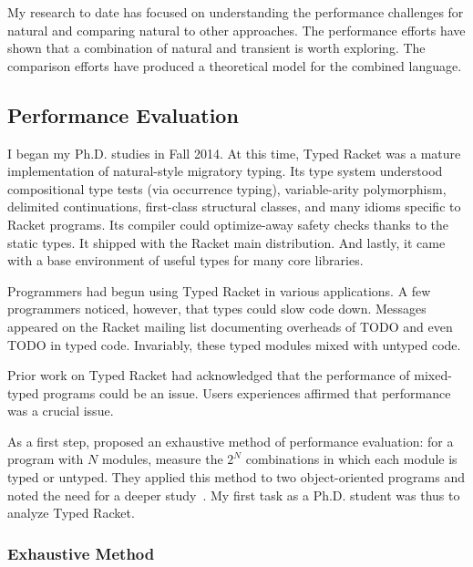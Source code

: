 %
%
%
%

My research to date has focused on
 understanding the performance challenges for natural
 and comparing natural to other approaches.
The performance efforts have shown that a combination of natural
 and transient is worth exploring.
The comparison efforts have produced a theoretical model for the combined
 language.


\subsection{Performance Evaluation}

I began my Ph.D. studies in Fall 2014.
At this time, Typed Racket was a mature implementation of natural-style
 migratory typing.
Its type system understood compositional type tests (via occurrence typing),
 variable-arity polymorphism,
 delimited continuations,
 first-class structural classes,
 and many idioms specific to Racket programs.
Its compiler could optimize-away safety checks thanks to the static types.
It shipped with the Racket main distribution.
And lastly, it came with a base environment of useful types for many core
 libraries.

Programmers had begun using Typed Racket in various applications.
A few programmers noticed, however, that types could slow code down.
Messages appeared on the Racket mailing list documenting overheads
 of TODO and even TODO in typed code.
Invariably, these typed modules mixed with untyped code.

Prior work on Typed Racket had acknowledged that the performance of mixed-typed
 programs could be an issue.
Users experiences affirmed that performance was a crucial issue.

As a first step,  proposed an exhaustive method of performance
 evaluation: for a program with $N$ modules, measure the $2^N$ combinations in
 which each module is typed or untyped.
They applied this method to two object-oriented programs and noted the need
 for a deeper study~\cite{stop}.
My first task as a Ph.D. student was thus to analyze Typed Racket.


\subsubsection{Exhaustive Method}




